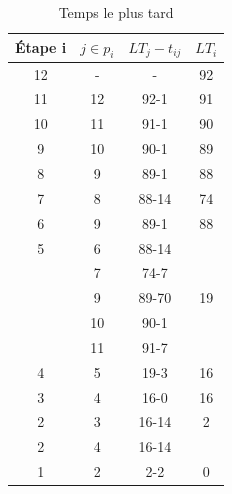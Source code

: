 \documentclass{article}
\begin{document}
\begin{center}
\begin{table}[]
\caption{Temps le plus tard} \label{tab:Temps le plus tard}
    \begin{center}
        \begin{tabular}{|c|c|c|c|}
            \hline
            Étape i & $j \in p_i$ & $LT_j-t_{ij}$ & $LT_i$ \\
            \hline
            12       & -           & -             & 92     \\
            11       & 12          & 92-1          & 91     \\
            10       & 11          & 91-1          & 90     \\
            9        & 10          & 90-1          & 89     \\
            8        & 9           & 89-1          & 88     \\
            7        & 8           & 88-14         & 74     \\
            6        & 9           & 89-1          & 88     \\
            5        & 6           & 88-14         &        \\
                     & 7           & 74-7          &        \\
                     & 9           & 89-70         & 19     \\
                     & 10          & 90-1          &        \\
                     & 11          & 91-7          &        \\
            
            4        & 5           & 19-3          & 16     \\
            3        & 4           & 16-0          & 16     \\
            2        & 3           & 16-14         & 2      \\
            2        & 4           & 16-14         &        \\
            1        & 2           & 2-2           & 0      \\
            \hline
                                                     
                        
                                        
        \end{tabular}
    \end{center}
\end{table}


\end{center}
\end{document}
